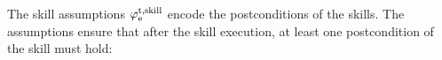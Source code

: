\documentclass[letterpaper, 10 pt, conference]{ieeeconf}
\begin{document}




The skill assumptions $\varphi_\textrm{e}^\textrm{t,skill}$ encode the postconditions of the skills. 
The assumptions ensure that after the skill execution, 
at least one postcondition of the skill must hold:
\end{document}

